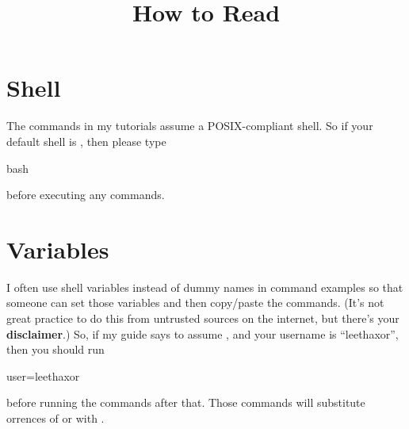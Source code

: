 
\title{How to Read}
\date{}


\section{Shell}
The commands in my tutorials assume a POSIX-compliant shell.
So if your default shell is , then please type
\begin{code}
bash
\end{code}
before executing any commands.

\section{Variables}
I often use shell variables instead of dummy names in command examples so that someone can set those variables and then copy/paste the commands.
(It's not great practice to do this from untrusted sources on the internet, but there's your \textbf{disclaimer}.)
So, if my guide says to assume , and your username is ``leethaxor'', then you should run
\begin{code}
user=leethaxor
\end{code}
before running the commands after that.
Those commands will substitute orrences of  or  with .




